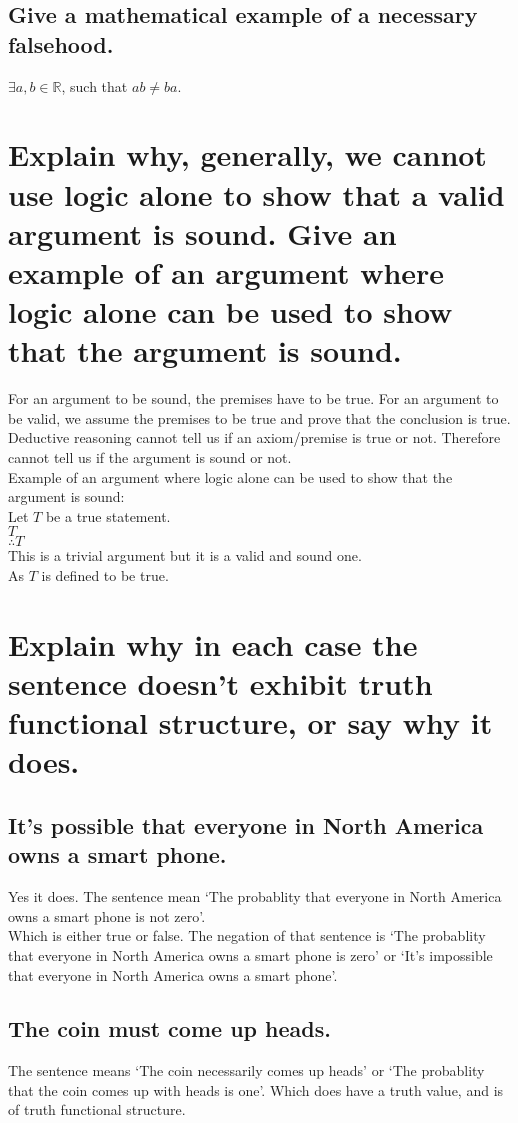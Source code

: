 \documentclass[10pt, letterpaper, titlepage]{article}
\begin{document}
        \subsection{Give a mathematical example of a necessary falsehood.}
            $\exists a, b \in \mathbb{R}$, such that $ab \neq ba$.

    \newpage
    \section{Explain why, generally, we cannot use logic alone to show that a valid argument is
        sound. Give an example of an argument where logic alone can be used to show that
        the argument is sound.}
        For an argument to be sound, the premises have to be true. 
        For an argument to be valid, we assume the premises to be true and prove that the conclusion is true.
        Deductive reasoning cannot tell us if an axiom/premise is true or not.
        Therefore cannot tell us if the argument is sound or not.\\
        Example of an argument where logic alone can be used to show that the argument is sound:\\
        Let $T$ be a true statement.\\
        $T$\\
        $\therefore T$\\
        This is a trivial argument but it is a valid and sound one.\\
        As $T$ is defined to be true.
        
    \section{Explain why in each case the sentence doesn’t exhibit truth functional structure, or
        say why it does.}
        \subsection{It’s possible that everyone in North America owns a smart phone.}
            Yes it does. The sentence mean `The probablity that everyone in North America owns a smart phone is not zero'.\\
            Which is either true or false.
            The negation of that sentence is `The probablity that everyone in North America owns a smart phone is zero' 
            or `It's impossible that everyone in North America owns a smart phone'.
        \subsection{The coin must come up heads.}
            The sentence means `The coin necessarily comes up heads' 
            or `The probablity that the coin comes up with heads is one'.
            Which does have a truth value, and is of truth functional structure.
\end{document}

